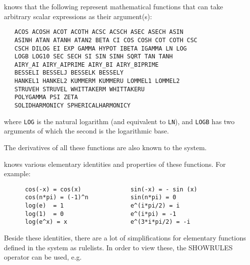 {\REDUCE} knows that the following represent mathematical functions
 that can
take arbitrary scalar expressions as their argument(s):
\begin{verbatim}
   ACOS ACOSH ACOT ACOTH ACSC ACSCH ASEC ASECH ASIN
   ASINH ATAN ATANH ATAN2 BETA CI COS COSH COT COTH CSC
   CSCH DILOG EI EXP GAMMA HYPOT IBETA IGAMMA LN LOG
   LOGB LOG10 SEC SECH SI SIN SINH SQRT TAN TANH
   AIRY_AI AIRY_AIPRIME AIRY_BI AIRY_BIPRIME
   BESSELI BESSELJ BESSELK BESSELY
   HANKEL1 HANKEL2 KUMMERM KUMMERU LOMMEL1 LOMMEL2
   STRUVEH STRUVEL WHITTAKERM WHITTAKERU
   POLYGAMMA PSI ZETA
   SOLIDHARMONICY SPHERICALHARMONICY
\end{verbatim}
where \texttt{LOG} is the natural logarithm (and equivalent to \texttt{LN}),
and \texttt{LOGB} has two arguments of which the second is the logarithmic base.

The derivatives of all these functions are also known to the system.

{\REDUCE} knows various elementary identities and properties
of these functions. For example:
\begin{verbatim}
      cos(-x) = cos(x)              sin(-x) = - sin (x)
      cos(n*pi) = (-1)^n            sin(n*pi) = 0
      log(e)  = 1                   e^(i*pi/2) = i
      log(1)  = 0                   e^(i*pi) = -1
      log(e^x) = x                  e^(3*i*pi/2) = -i
\end{verbatim}

Beside these identities, there are a lot of simplifications
for elementary functions
defined in the {\REDUCE} system as rulelists. In order to
view these, the SHOWRULES operator can be used, e.g.

